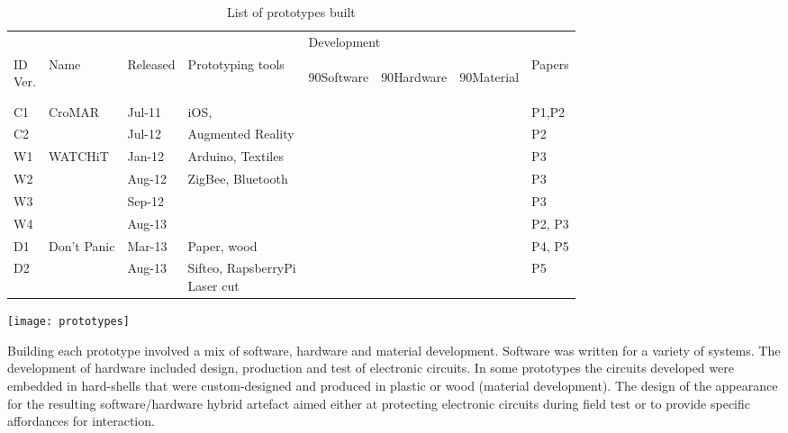 \begin{table}
	[!p] \centering \caption{List of prototypes built} \label{tab:prototypes} 
	\begin{threeparttable}
		\begin{tabular}{@{}llllllll@{}} 
			\toprule 
			& & & & \multicolumn{3}{l}{Development}  \\
			\cline{5-7} \noalign{\smallskip} 
			\specialcell[b]{ID\\Ver.} & Name & Released & Prototyping tools & 
			\begin{turn}
				{90}Software
			\end{turn}
			& 
			\begin{turn}
				{90}Hardware
			\end{turn}
			& 
			\begin{turn}
				{90}Material
			\end{turn}
			& Papers \\
			\midrule \noalign{\smallskip} C1 & CroMAR & Jul-11 & iOS, & \textbullet & & & P1,P2 \\
			C2 & & Jul-12 & Augmented Reality & \textbullet & & & P2 \\
			\hline \noalign{\smallskip} W1 & WATCHiT & Jan-12 & Arduino, Textiles & \textbullet & \textbullet & & P3 \\
			W2 & & Aug-12 & ZigBee, Bluetooth & \textbullet & \textbullet & & P3 \\
			W3 & & Sep-12 & & \textbullet & \textbullet & & P3 \\
			W4 & & Aug-13 & & \textbullet & \textbullet & \textbullet & P2, P3 \\
			\hline \noalign{\smallskip} D1 & Don't Panic & Mar-13 & Paper, wood & & & \textbullet & P4, P5 \\
			D2 & & Aug-13 & \specialcell[t]{Sifteo, RapsberryPi\\Laser cut} & \textbullet & \textbullet & \textbullet & P5 \\
			\bottomrule 
		\end{tabular}
		\begin{tablenotes}
			\item 
			\texttt{[image: prototypes]} 
		\end{tablenotes}
	\end{threeparttable}
\end{table}

Building each prototype involved a mix of software, hardware and material development. Software was written for a variety of systems. The development of hardware included design, production and test of electronic circuits. In some prototypes the circuits developed were embedded in hard-shells that were custom-designed and produced in plastic or wood (material development). The design of the appearance for the resulting software/hardware hybrid artefact aimed either at protecting electronic circuits during field test or to provide specific affordances for interaction.

